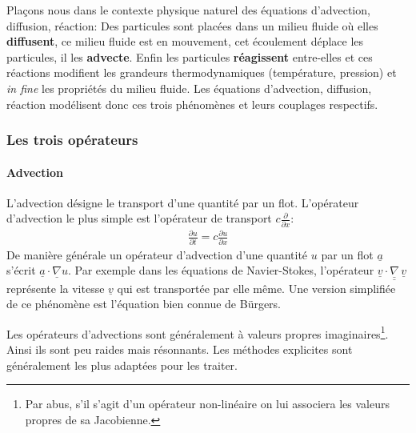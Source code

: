 Plaçons nous dans le contexte physique naturel des équations d'advection, diffusion, réaction:
Des particules sont placées dans un milieu fluide où elles \textbf{diffusent}, ce milieu fluide
est en mouvement, cet écoulement déplace les particules, il les \textbf{advecte}.
Enfin les particules \textbf{réagissent} entre-elles et ces réactions modifient les grandeurs thermodynamiques (température, pression) et \textit{in fine} les propriétés
du milieu fluide.
Les équations d'advection, diffusion, réaction modélisent donc ces trois phénomènes et leurs couplages respectifs.

\subsubsection{Les trois opérateurs}
\paragraph{Advection}
    L'advection désigne le transport d'une quantité par un flot. L'opérateur d'advection le plus simple est l'opérateur
    de transport $c \frac{\partial}{\partial x}$:
    \begin{align}\frac{\partial u}{\partial t} = c \frac{\partial u}{\partial x}\end{align}
    De manière générale un opérateur d’advection d'une quantité $u$ par un flot $\underline a$ s'écrit $\underline a \cdot \underline{\nabla} u$.
    Par exemple dans les équations de Navier-Stokes, l'opérateur $\underline{v} \cdot \underline{\underline \nabla} \, \underline{v}$ représente 
    la vitesse $\underline v$ qui est transportée par elle même. Une version simplifiée de ce phénomène est l'équation bien connue de Bürgers.\par 
    Les opérateurs d'advections sont généralement à valeurs propres imaginaires\footnote{Par abus, s'il s'agit d'un opérateur non-linéaire on lui associera les valeurs propres de sa Jacobienne.}.
    Ainsi ils sont peu raides mais résonnants. Les méthodes explicites sont généralement les plus adaptées pour les traiter.

